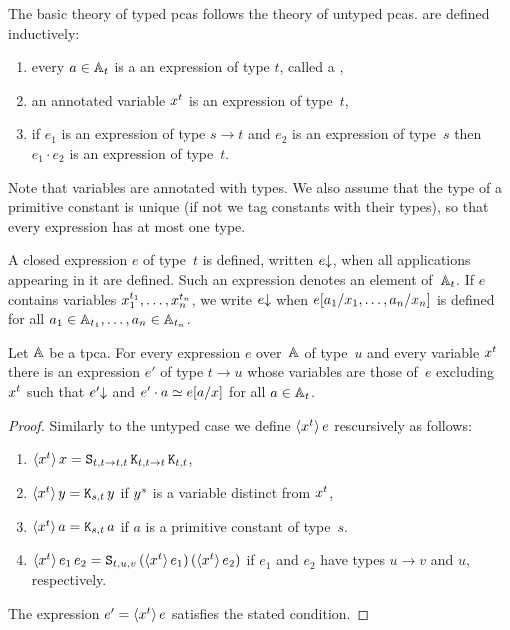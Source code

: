 The basic theory of typed pcas follows the theory of untyped pcas.
 are defined inductively:
%
\begin{enumerate}
\item every $a \in \AA_t$ is a an expression of type $t$, called a
  ,
\item an annotated variable $\annot{x}{t}$ is an expression of type~$t$,
\item if $e_1$ is an expression of type $s \to t$ and $e_2$ is an
  expression of type~$s$ then $e_1 \cdot e_2$ is an expression of
  type~$t$.
\end{enumerate}
%
Note that variables are annotated with types. We also
assume that the type of a primitive constant is unique (if not we tag
constants with their types), so that every expression has at most one type.

A closed expression $e$ of type~$t$ is defined, written $\defined{e}$,
when all applications appearing in it are defined. Such an expression
denotes an element of~$\AA_t$. If $e$ contains variables
$\annot{x_1}{t_1}, \ldots, \annot{x_n}{t_n}$, we write $\defined{e}$
when $\subst{e}{a_1/x_1, \ldots, a_n/x_n}$ is defined
for all $a_1 \in \AA_{t_1}, \ldots, a_n \in \AA_{t_n}$.

\begin{theorem}
  Let $\AA$ be a tpca. For every expression $e$ over~$\AA$ of type~$u$ and
  every variable $\annot{x}{t}$ there is an expression $e'$ of type $t
  \to u$ whose variables are those of~$e$ excluding~$\annot{x}{t}$
  such that $\defined{e'}$ and $e' \cdot a \kleq \subst{e}{a/x}$ for all $a \in \AA_t$.
\end{theorem}

\begin{proof}
  Similarly to the untyped case we define $\tpcalam{x}{t} e$ rescursively as follows:
  \begin{enumerate}
  \item $\tpcalam{x}{t} x = \combS_{t,t \to t,t} \, \combK_{t,t \to
      t} \, \combK_{t,t}$,
  \item $\tpcalam{x}{t} y = \combK_{s,t}\, y$ if $\annot{y}{s}$ is a
    variable distinct from $\annot{x}{t}$,
  \item $\tpcalam{x}{t} a = \combK_{s,t} \, a$ if $a$ is a primitive
    constant of type~$s$.
  \item $\tpcalam{x}{t} {e_1\, e_2} = \combS_{t,u,v}\,
    (\tpcalam{x}{t} e_1) \, (\tpcalam{x}{t} e_2)$ if $e_1$ and
    $e_2$ have types $u \to v$ and $u$, respectively.
  \end{enumerate}
  The expression $e' = \tpcalam{x}{t} e$ satisfies the stated condition.
\end{proof}

